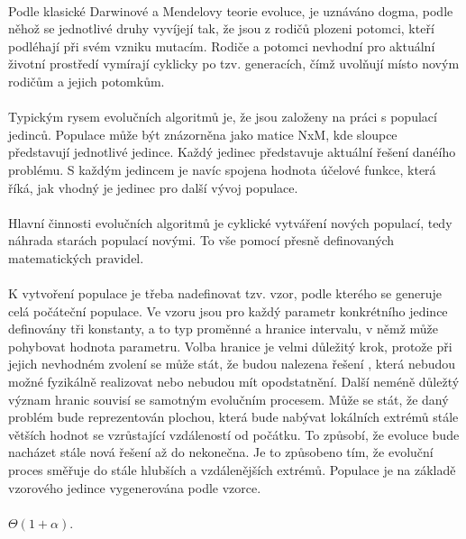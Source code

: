 \documentclass[bc,male,java,dept460]{diploma}		%
\begin{document}
\paragraph*{}
Podle klasické Darwinové a Mendelovy teorie evoluce, je uznáváno dogma, podle něhož se jednotlivé druhy vyvíjejí tak, že jsou z rodičů plozeni potomci, kteří podléhají při svém vzniku mutacím. Rodiče a potomci nevhodní pro aktuální životní prostředí vymírají cyklicky po tzv. generacích, čímž uvolňují místo novým rodičům a jejich potomkům.
\paragraph*{}
Typickým rysem evolučních algoritmů je, že jsou založeny na práci s populací jedinců. Populace může být znázorněna jako matice NxM, kde sloupce představují jednotlivé jedince. Každý jedinec představuje aktuální řešení danéího problému. S každým jedincem je navíc spojena hodnota účelové funkce, která říká, jak vhodný je jedinec pro další vývoj populace.
\paragraph*{}
Hlavní činnosti evolučních algoritmů je cyklické vytváření nových populací, tedy náhrada starách populací novými. To vše pomocí přesně definovaných matematických pravidel.
\paragraph*{}
K vytvoření populace je třeba nadefinovat tzv. vzor, podle kterého se generuje celá počáteční populace. Ve vzoru jsou pro každý parametr konkrétního jedince definovány tři konstanty, a to typ proměnné a hranice intervalu, v němž může pohybovat hodnota parametru. Volba hranice je velmi důležitý krok, protože při jejich nevhodném zvolení se může stát, že budou nalezena řešení , která nebudou možné fyzikálně realizovat nebo nebudou mít opodstatnění. 
Další neméně důležtý význam hranic souvisí se samotným evolučním procesem. Může se stát, že daný problém bude reprezentován plochou, která bude nabývat lokálních extrémů stále větších hodnot se vzrůstající vzdáleností od počátku. To způsobí, že evoluce bude nacházet stále nová řešení až do nekonečna. Je to způsobeno tím, že evoluční proces směřuje do stále hlubších a vzdálenějších extrémů.
Populace je na základě vzorového jedince vygenerována podle vzorce.
\paragraph*{}
$\Theta(1+\alpha)$.  
\end{document}
